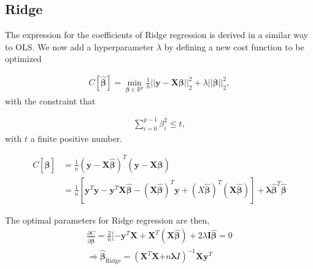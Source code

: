 \documentclass[a4paper,12pt]{article}
\begin{document}
\subsection{Ridge}
The expression for the coefficients of Ridge regression is derived in a similar way to OLS. We now add a hyperparameter $\lambda$ by defining a new cost function to be optimized

\begin{equation} \label{eq1}
\begin{split}
{C[\boldsymbol{\hat{\beta}}]=\displaystyle \min_{\boldsymbol{\beta}\in
{\mathbb{R}}^{p}}}\frac{1}{n}\vert\vert \boldsymbol{y}-\boldsymbol{X}\boldsymbol{\beta}\vert\vert_2^2+\lambda\vert\vert \boldsymbol{\beta}\vert\vert_2^2,
\end{split}
\end{equation}
with the constraint that

\begin{equation} \label{eq1}
\begin{split}
\sum_{i=0}^{p-1} \beta_i^2 \leq t,
\end{split}
\end{equation}
\noindent
with $t$ a finite positive number.

\begin{equation} \label{eq1}
\begin{split}
C[\boldsymbol{\hat{\beta}}]&=\frac{1}{n}(\boldsymbol{y}-\boldsymbol{X}\hat{\boldsymbol{\beta}})^T(\boldsymbol{y}-\boldsymbol{X}\hat{\boldsymbol{\beta}})\\
&=\frac{1}{n}[\boldsymbol{y}^T\boldsymbol{y}-\boldsymbol{y}^T\boldsymbol{X}\hat{\boldsymbol{\beta}}-(\boldsymbol{X}\hat{\boldsymbol{\beta}})^T\boldsymbol{y}+(X\hat{\boldsymbol{\beta}})^T(\boldsymbol{X}\hat{\boldsymbol{\beta}})]+\boldsymbol{\lambda}\hat{\boldsymbol{\beta}}^T\hat{\boldsymbol{\beta}}
\end{split}
\end{equation}

\noindent
The optimal parameters for Ridge regression are then,
\begin{equation} \label{eq1}
\begin{split}
\frac{\partial C}{\partial \hat{\boldsymbol{\beta}}}=\frac{2}{n}[-\boldsymbol{y}^T\boldsymbol{X}+\boldsymbol{X}^T(\boldsymbol{X}\hat{\boldsymbol{\beta}})+2\lambda \boldsymbol{I}\hat{\boldsymbol{\beta}}=0 \\
\Rightarrow \boldsymbol{\hat{\boldsymbol{\beta}}}_{\mathrm{Ridge}}=(\boldsymbol{X}^T\boldsymbol{X}\boldsymbol+n\boldsymbol{\lambda} I)^{-1}\boldsymbol{X}\boldsymbol{y}^T
\end{split}
\end{equation}
\end{document}
